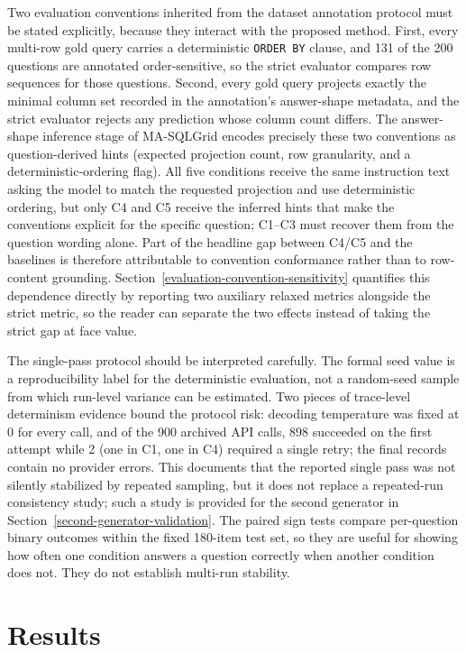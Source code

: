 \documentclass[applsci,article,submit,moreauthors]{Definitions/mdpi}
\begin{document}
Two evaluation conventions inherited from the dataset annotation protocol must be stated explicitly, because they interact with the proposed method. First, every multi-row gold query carries a deterministic \texttt{ORDER BY} clause, and 131 of the 200 questions are annotated order-sensitive, so the strict evaluator compares row sequences for those questions. Second, every gold query projects exactly the minimal column set recorded in the annotation's answer-shape metadata, and the strict evaluator rejects any prediction whose column count differs. The answer-shape inference stage of MA-SQLGrid encodes precisely these two conventions as question-derived hints (expected projection count, row granularity, and a deterministic-ordering flag). All five conditions receive the same instruction text asking the model to match the requested projection and use deterministic ordering, but only C4 and C5 receive the inferred hints that make the conventions explicit for the specific question; C1--C3 must recover them from the question wording alone. Part of the headline gap between C4/C5 and the baselines is therefore attributable to convention conformance rather than to row-content grounding. Section~\ref{evaluation-convention-sensitivity} quantifies this dependence directly by reporting two auxiliary relaxed metrics alongside the strict metric, so the reader can separate the two effects instead of taking the strict gap at face value.

The single-pass protocol should be interpreted carefully. The formal seed value is a reproducibility label for the deterministic evaluation, not a random-seed sample from which run-level variance can be estimated. Two pieces of trace-level determinism evidence bound the protocol risk: decoding temperature was fixed at 0 for every call, and of the 900 archived API calls, 898 succeeded on the first attempt while 2 (one in C1, one in C4) required a single retry; the final records contain no provider errors. This documents that the reported single pass was not silently stabilized by repeated sampling, but it does not replace a repeated-run consistency study; such a study is provided for the second generator in Section~\ref{second-generator-validation}. The paired sign tests compare per-question binary outcomes within the fixed 180-item test set, so they are useful for showing how often one condition answers a question correctly when another condition does not. They do not establish multi-run stability.

\section{Results}\label{results}
\end{document}
